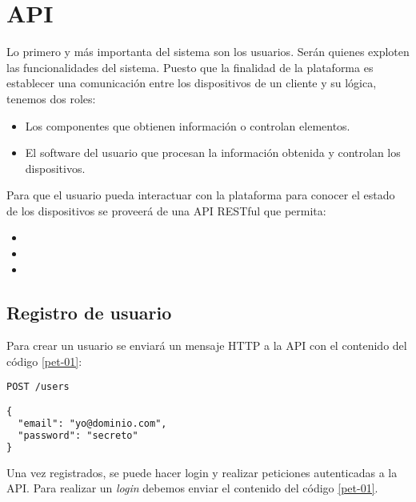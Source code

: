 \chapter{API}
\pagestyle{esitscCD}

Lo primero y más importanta del sistema son los usuarios. Serán quienes exploten
las funcionalidades del sistema. Puesto que la finalidad de la plataforma es
establecer una comunicación entre los dispositivos de un cliente y su lógica,
tenemos dos roles:

\begin{itemize}\itemsep1pt \parskip0pt 
\item {} Los componentes que obtienen información o
controlan elementos.
\item {} El software del usuario que procesan la información
obtenida y controlan los dispositivos.
\end{itemize}

Para que el usuario pueda interactuar con la plataforma para conocer el estado
de los dispositivos se proveerá de una API RESTful que permita:

\begin{itemize}\itemsep1pt \parskip0pt 
\item {}
\item {}
\item {}
\end{itemize}

\section{Registro de usuario}

Para crear un usuario se enviará un mensaje HTTP a la API con el contenido del
código \ref{pet-01}:

\begin{minipage}{\textwidth}
\begin{lstlisting}[language=TeX,caption={Petición para creación de usuario}, breaklines=true, label=pet-01]
POST /users

{
  "email": "yo@dominio.com",
  "password": "secreto"
}
\end{lstlisting}
\end{minipage}

Una vez registrados, se puede hacer login y realizar peticiones autenticadas a
la API. Para realizar un \emph{login} debemos enviar el contenido del código \ref{pet-01}.

